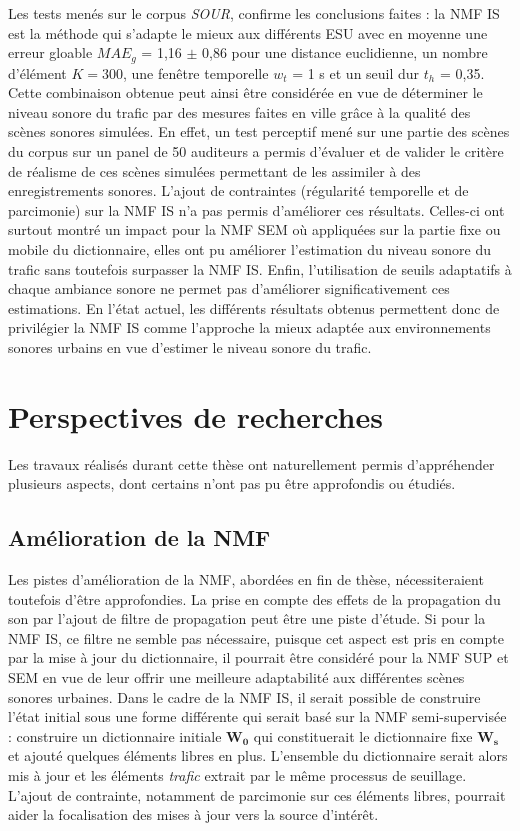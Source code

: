 Les tests menés sur le corpus \textit{SOUR}, confirme les conclusions faites : la NMF IS est la méthode qui s'adapte le mieux aux différents ESU avec en moyenne une erreur gloable $MAE_g$ = 1,16 $\pm$ 0,86 pour une distance euclidienne, un nombre d'élément $K = 300$, une fenêtre temporelle $w_t$ = 1 s et un seuil dur $t_h$ = 0,35. Cette combinaison obtenue peut ainsi être considérée en vue de déterminer le niveau sonore du trafic par des mesures faites en ville grâce à la qualité des scènes sonores simulées. En effet, un test perceptif mené sur une partie des scènes du corpus sur un panel de 50 auditeurs a permis d'évaluer et de valider le critère de \og réalisme \fg{} de ces scènes simulées permettant de les assimiler à des enregistrements sonores.
L'ajout de contraintes (régularité temporelle et de parcimonie) sur la NMF IS n'a pas permis d'améliorer ces résultats. Celles-ci ont surtout montré un impact pour la NMF SEM où appliquées sur la partie fixe ou mobile du dictionnaire, elles ont pu améliorer l'estimation du niveau sonore du trafic sans toutefois surpasser la NMF IS. Enfin, l'utilisation de seuils adaptatifs à chaque ambiance sonore ne permet pas d'améliorer significativement ces estimations. 
En l'état actuel, les différents résultats obtenus permettent donc de privilégier la NMF IS comme l'approche la mieux adaptée aux environnements sonores urbains en vue d'estimer le niveau sonore du trafic. 


\section*{Perspectives de recherches}

Les travaux réalisés durant cette thèse ont naturellement permis d'appréhender plusieurs aspects, dont certains n'ont pas pu être approfondis ou étudiés.

\subsection*{Amélioration de la NMF}

Les pistes d'amélioration de la NMF, abordées en fin de thèse, nécessiteraient toutefois d'être approfondies. 
La prise en compte des effets de la propagation du son par l'ajout de filtre de propagation peut être une piste d'étude. Si pour la NMF IS, ce filtre ne semble pas nécessaire, puisque cet aspect est pris en compte par la mise à jour du dictionnaire, il pourrait être considéré pour la NMF SUP et SEM en vue de leur offrir une meilleure adaptabilité aux différentes scènes sonores urbaines.
Dans le cadre de la NMF IS, il serait possible de construire l'état initial sous une forme différente qui serait basé sur la NMF semi-supervisée : construire un dictionnaire initiale $\mathbf{W_0}$ qui constituerait le dictionnaire fixe $\mathbf{W_s}$ et ajouté quelques éléments libres en plus. L'ensemble du dictionnaire serait alors mis à jour et les éléments \textit{trafic} extrait par le même processus de seuillage. L'ajout de contrainte, notamment de parcimonie sur ces éléments libres, pourrait aider la focalisation des mises à jour vers la source d'intérêt.

